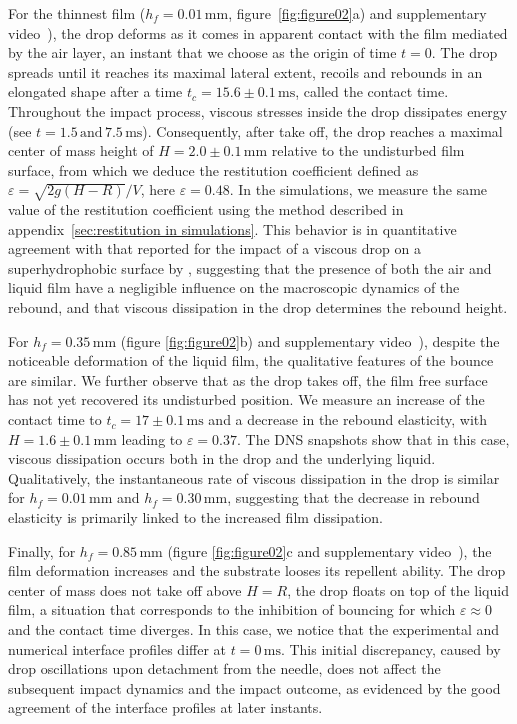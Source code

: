 For the thinnest film ($h_f = 0.01\,\si{\milli\meter}$, figure~\ref{fig:figure02}a) and supplementary video~), 
the drop deforms as it comes in apparent contact with the film mediated by the air layer, an instant that we choose as the origin of time $t = 0$. The drop spreads until it reaches its maximal lateral extent, recoils and rebounds in an elongated shape after a time $t_c = 15.6 \pm 0.1\,\si{\milli\second}$, called the contact time. Throughout the impact process, viscous stresses inside the drop dissipates energy (see $t = 1.5\,\text{and}\,7.5\,\si{\milli\second}$). Consequently, after take off, the drop reaches a maximal center of mass height of $H = 2.0 \pm 0.1\,\si{\milli\meter}$ relative to the undisturbed film surface, from which we deduce the restitution coefficient defined as $\varepsilon = \sqrt{2g(H-R)}/V$, here $\varepsilon = 0.48$. In the simulations, we measure the same value of the restitution coefficient using the method described in appendix~\ref{sec:restitution in simulations}. This behavior is in quantitative agreement with that reported for the impact of a viscous drop on a superhydrophobic surface by \citet{jha2020viscous}, suggesting that the presence of both the air and liquid film have a negligible influence on the macroscopic dynamics of the rebound, and that viscous dissipation in the drop determines the rebound height.

For $h_f = 0.35\,\si{\milli\meter}$ (figure \ref{fig:figure02}b) and supplementary video~), 
despite the noticeable deformation of the liquid film, the qualitative features of the bounce are similar. We further observe that as the drop takes off, the film free surface has not yet recovered its undisturbed position. We measure an increase of the contact time to $t_c = 17 \pm 0.1\,\si{\milli\second}$ and a decrease in the rebound elasticity, with $H = 1.6 \pm 0.1\,\si{\milli\meter}$ leading to $\varepsilon = 0.37$.  The DNS snapshots show that in this case, viscous dissipation occurs both in the drop and the underlying liquid. Qualitatively, the instantaneous rate of viscous dissipation in the drop is similar for $h_f = 0.01\,\si{\milli\meter}$ and $h_f = 0.30\,\si{\milli\meter}$, suggesting that the decrease in rebound elasticity is primarily linked to the increased film dissipation.

Finally, for $h_f = 0.85\,\si{\milli\meter}$ (figure \ref{fig:figure02}c and supplementary video~), the film deformation increases and the substrate looses its repellent ability. The drop center of mass does not take off above $H=R$, the drop floats on top of the liquid film, a situation that corresponds to the inhibition of bouncing for which $\varepsilon \approx 0$ and the contact time diverges. In this case, we notice that the experimental and numerical interface profiles differ at $t= 0\,\si{\milli\second}$. This initial discrepancy, caused by drop oscillations upon detachment from the needle, does not affect the subsequent impact dynamics and the impact outcome, as evidenced by the good agreement of the interface profiles at later instants.

